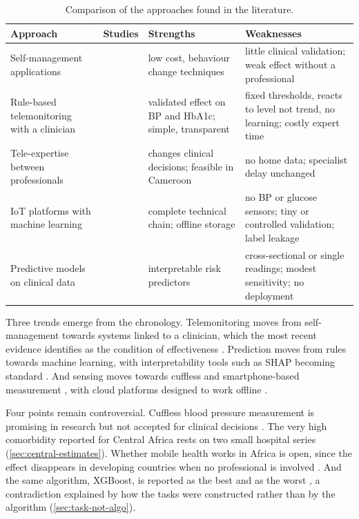 \documentclass[11pt,a4paper,oneside]{report}
\begin{document}
\begin{table}[htbp]
\centering\footnotesize
\caption{Comparison of the approaches found in the literature.}\label{tab:approaches}
\begin{tabularx}{\textwidth}{@{}>{\raggedright\arraybackslash}p{2.6cm} >{\raggedright\arraybackslash}p{2.6cm} >{\raggedright\arraybackslash}X >{\raggedright\arraybackslash}X@{}}
\toprule
\textbf{Approach} & \textbf{Studies} & \textbf{Strengths} & \textbf{Weaknesses} \\
\midrule
Self-management applications & \textcite{alessa2019,zhou2024} & low cost, behaviour change techniques & little clinical validation; weak effect without a professional \\
Rule-based telemonitoring with a clinician & \textcite{kingue2013,mihevc2025} & validated effect on BP and HbA1c; simple, transparent & fixed thresholds, reacts to level not trend, no learning; costly expert time \\
Tele-expertise between professionals & \textcite{bediang2021} & changes clinical decisions; feasible in Cameroon & no home data; specialist delay unchanged \\
IoT platforms with machine learning & \textcite{tai2024,efendi2025,liu2025review} & complete technical chain; offline storage & no BP or glucose sensors; tiny or controlled validation; label leakage \\
Predictive models on clinical data & \textcite{chatrati2022,mendoza2025} & interpretable risk predictors & cross-sectional or single readings; modest sensitivity; no deployment \\
\bottomrule
\end{tabularx}
\end{table}

Three trends emerge from the chronology. Telemonitoring moves from self-management towards systems linked to a clinician, which the most recent evidence identifies as the condition of effectiveness \parencite{mao2020,bandeira2024,mihevc2025}. Prediction moves from rules towards machine learning, with interpretability tools such as SHAP becoming standard \parencite{mendoza2025,liu2025ppg}. And sensing moves towards cuffless and smartphone-based measurement \parencite{alhaddad2022,liu2025ppg}, with cloud platforms designed to work offline \parencite{efendi2025}.

Four points remain controversial. Cuffless blood pressure measurement is promising in research \parencite{liu2025ppg} but not accepted for clinical decisions \parencite{who2023hypertension}. The very high comorbidity reported for Central Africa rests on two small hospital series (\cref{sec:central-estimates}). Whether mobile health works in Africa is open, since the effect disappears in developing countries when no professional is involved \parencite{mao2020}. And the same algorithm, XGBoost, is reported as the best \parencite{efendi2025} and as the worst \parencite{mendoza2025}, a contradiction explained by how the tasks were constructed rather than by the algorithm (\cref{sec:task-not-algo}).
\end{document}
